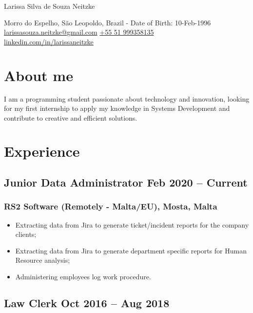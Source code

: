 \documentclass[11pt]{article}
\begin{document}
\begin{center}      
    {\fontsize{28}{28}\selectfont Larissa Silva de Souza Neitzke} \\ \bigskip

    {\color{icnclr}\faMapMarker} Morro do Espelho, São Leopoldo, Brazil - Date of Birth: 10-Feb-1996 \\ \quad 
    {\color{icnclr}\faEnvelope[regular]} \href{mailto:myaname@email.com}{larissasouza.neitzke@gmail.com} \quad
    {\color{icnclr}} \href{tel:+920000000000}{+55 51 999358135}\\ 
    {\color{icnclr}\faLinkedinIn} \href{https://www.linkedin.com/in/larissaneitzke}{linkedin.com/in/larissaneitzke}
\end{center}
\section{About me}
I am a programming student passionate about technology and innovation, looking for my first internship to apply my knowledge in Systems Development and contribute to creative and efficient solutions. 
\section{Experience}
\subsection{Junior Data Administrator \hfill \normalfont Feb 2020 -- Current}
\subsubsection{RS2 Software (Remotely - Malta/EU), Mosta, Malta}
\begin{itemize}
    \item[\checkmark] Extracting data from Jira to generate ticket/incident reports for the company clients; 
    \item[\checkmark]  Extracting data from Jira to generate department specific reports for Human Resource analysis;
    \item[\checkmark] Administering employees log work procedure.
\end{itemize}

\subsection{Law Clerk \hfill \normalfont Oct 2016 -- Aug 2018}
\end{document}
